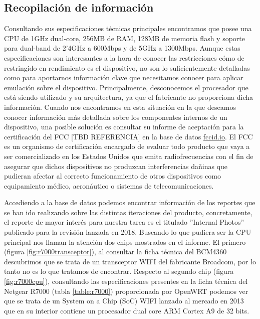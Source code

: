 \subsection{Recopilación de información}
Consultando sus especificaciones técnicas principales 
encontramos que posee una CPU de 1GHz dual-core, 256MB de RAM, 128MB de memoria flash y soporte para dual-band de 2'4GHz a 600Mbps y de 5GHz a 
1300Mbps. Aunque estas especificaciones son interesantes a la hora de conocer las restricciones cómo de restringido en rendimiento es el dispositivo,
no son lo suficientemente detalladas como para aportarnos información clave que necesitamos conocer para aplicar emulación sobre el dispositivo.
Principalmente, desconocemos el procesador que está siendo utilizado y su arquitectura, ya que el fabricante no proporciona dicha información.
Cuando nos encontramos en esta situación en la que deseamos conocer información más detallada sobre los componentes internos de un dispositivo, 
una posible solución es consultar su informe de aceptación para la certificación del FCC\cite{fcc} [TBD REFERENCIA] en la base de datos \hyperlink{fccid.io}{fccid.io}.
El FCC es un organismo de certificación encargado de evaluar todo producto que vaya a ser comercializado en los Estados Unidos que emita 
radiofrecuencias con el fin de asegurar que dichos dispositivos no produzcan interferencias dañinas que pudieran afectar al correcto
funcionamiento de otros dispositivos como equipamiento médico, aeronáutico o sistemas de telecomunicaciones.\bigskip

Accediendo a la base de datos podemos encontrar información de los reportes que se han ido realizando sobre las distintas iteraciones del producto,
concretamente, el reporte de mayor interés para nuestra tarea es el titulado ''Internal Photos'' publicado para la revisión lanzada en 2018\cite{netgearFCCid}.
Buscando lo que pudiera ser la CPU principal nos llaman la atención dos chips mostrados en el informe. El primero (figura \ref{fig:r7000transceptor}), al 
consultar la ficha técnica del BCM4360 descubrimos que se trata de un transceptor WIFI del fabricante Broadcom, por lo tanto no es lo que tratamos de 
encontrar. Respecto al segundo chip (figura \ref{fig:r7000cpu}), consultando las especificaciones presentes en la ficha técnica del Netgear R7000 
(tabla \ref{table:r7000}) proporcionada por OpenWRT podemos ver que se trata de un System on a Chip (SoC) WIFI lanzado al mercado en 2013\cite{broadcomSOCs} 
que en su interior contiene un procesador dual core ARM Cortex A9 de 32 bits.

